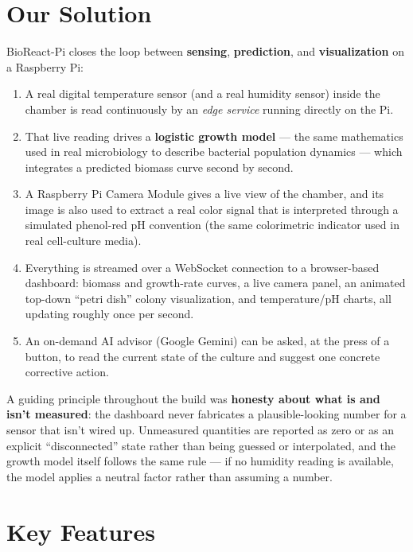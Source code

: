 \documentclass[11pt]{article}
\begin{document}
\section{Our Solution}

BioReact-Pi closes the loop between \textbf{sensing}, \textbf{prediction}, and \textbf{visualization} on a Raspberry Pi:

\begin{enumerate}
    \item A real digital temperature sensor (and a real humidity sensor) inside the chamber is read continuously by an \emph{edge service} running directly on the Pi.
    \item That live reading drives a \textbf{logistic growth model} --- the same mathematics used in real microbiology to describe bacterial population dynamics --- which integrates a predicted biomass curve second by second.
    \item A Raspberry Pi Camera Module gives a live view of the chamber, and its image is also used to extract a real color signal that is interpreted through a simulated phenol-red pH convention (the same colorimetric indicator used in real cell-culture media).
    \item Everything is streamed over a WebSocket connection to a browser-based dashboard: biomass and growth-rate curves, a live camera panel, an animated top-down ``petri dish'' colony visualization, and temperature/pH charts, all updating roughly once per second.
    \item An on-demand AI advisor (Google Gemini) can be asked, at the press of a button, to read the current state of the culture and suggest one concrete corrective action.
\end{enumerate}

A guiding principle throughout the build was \textbf{honesty about what is and isn't measured}: the dashboard never fabricates a plausible-looking number for a sensor that isn't wired up. Unmeasured quantities are reported as zero or as an explicit ``disconnected'' state rather than being guessed or interpolated, and the growth model itself follows the same rule --- if no humidity reading is available, the model applies a neutral factor rather than assuming a number.

\section{Key Features}
\end{document}
